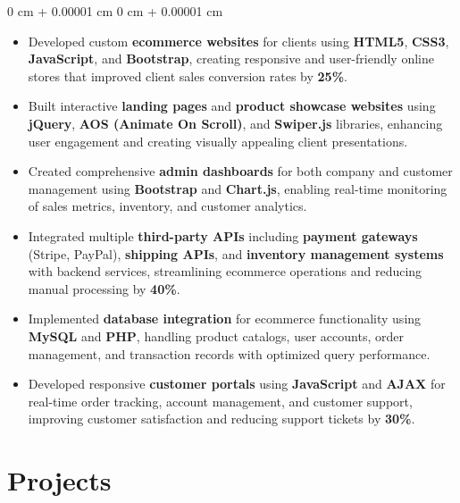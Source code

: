 \documentclass[10pt, letterpaper]{article}
\newenvironment{highlights}{
    \begin{itemize}[
        topsep=0.10 cm,
        parsep=0.10 cm,
        partopsep=0pt,
        itemsep=0pt,
        leftmargin=0 cm + 10pt
    ]
}{
    \end{itemize}
} %
\newenvironment{onecolentry}{
    \begin{adjustwidth}{
        0 cm + 0.00001 cm
    }{
        0 cm + 0.00001 cm
    }
}{
    \end{adjustwidth}
} %
\begin{document}
\begin{onecolentry}
	\begin{highlights}
		\item Developed custom \textbf{ecommerce websites} for clients using \textbf{HTML5}, \textbf{CSS3}, \textbf{JavaScript}, and \textbf{Bootstrap}, creating responsive and user-friendly online stores that improved client sales conversion rates by \textbf{25\%}.
		\item Built interactive \textbf{landing pages} and \textbf{product showcase websites} using \textbf{jQuery}, \textbf{AOS (Animate On Scroll)}, and \textbf{Swiper.js} libraries, enhancing user engagement and creating visually appealing client presentations.
		\item Created comprehensive \textbf{admin dashboards} for both company and customer management using \textbf{Bootstrap} and \textbf{Chart.js}, enabling real-time monitoring of sales metrics, inventory, and customer analytics.
		\item Integrated multiple \textbf{third-party APIs} including \textbf{payment gateways} (Stripe, PayPal), \textbf{shipping APIs}, and \textbf{inventory management systems} with backend services, streamlining ecommerce operations and reducing manual processing by \textbf{40\%}.
		\item Implemented \textbf{database integration} for ecommerce functionality using \textbf{MySQL} and \textbf{PHP}, handling product catalogs, user accounts, order management, and transaction records with optimized query performance.
		\item Developed responsive \textbf{customer portals} using \textbf{JavaScript} and \textbf{AJAX} for real-time order tracking, account management, and customer support, improving customer satisfaction and reducing support tickets by \textbf{30\%}.
	\end{highlights}
\end{onecolentry}



\vspace{0.2 cm}


\section{Projects}
\vspace{0.05 cm}
\end{document}
